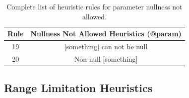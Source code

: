 \begin{table}[h]
	\centering
	\begin{tabular}{|c|c|}
		\hline
		\textbf{Rule} & \textbf{Nullness Not Allowed Heuristics (@param)} \\ \hline
		19 & [something] can not be null \\ \hline
		20 & Non-null [something] \\ \hline
	\end{tabular}
	\caption{Complete list of heuristic rules for parameter nullness not allowed.}
	\label{tab:complete-not-null-heuristic-param}
\end{table}

\subsection{Range Limitation Heuristics}
\label{app:range-limit}
